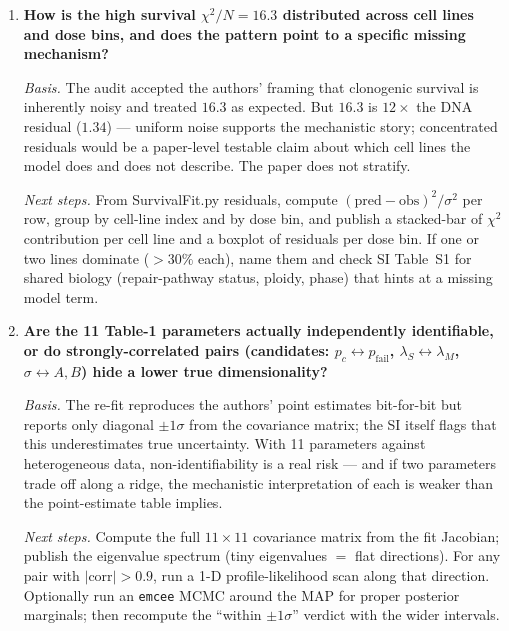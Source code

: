 \begin{enumerate}
  \emph{Next steps.} Use the Medras-MC 2021 chromatin-on-sphere driver to
  regenerate SI Fig.~S2 (misrepair fraction vs.\ $\sigma/R$ across break
  counts), fit $A,B$ to $\omega(R,\sigma) = A + (1{-}A) e^{-B\sigma/R}$,
  report the recovered constants with uncertainty, then re-run
  \texttt{DNAModelFit.py} and \texttt{SurvivalFit.py} with those
  constants. Check whether any of the 11 fitted parameters drift outside
  their paper $\pm 1\sigma$ bands.

\item \textbf{How is the high survival $\chi^2/N = 16.3$ distributed
      across cell lines and dose bins, and does the pattern point to a
      specific missing mechanism?}

  \emph{Basis.} The audit accepted the authors' framing that clonogenic
  survival is inherently noisy and treated $16.3$ as expected. But
  $16.3$ is $12\times$ the DNA residual ($1.34$) --- uniform noise
  supports the mechanistic story; concentrated residuals would be a
  paper-level testable claim about which cell lines the model does and
  does not describe. The paper does not stratify.

  \emph{Next steps.} From SurvivalFit.py residuals, compute
  $(\text{pred} - \text{obs})^2 / \sigma^2$ per row, group by cell-line
  index and by dose bin, and publish a stacked-bar of $\chi^2$
  contribution per cell line and a boxplot of residuals per dose bin. If
  one or two lines dominate ($>30\%$ each), name them and check SI
  Table~S1 for shared biology (repair-pathway status, ploidy, phase)
  that hints at a missing model term.

\item \textbf{Are the 11 Table-1 parameters actually independently
      identifiable, or do strongly-correlated pairs
      (candidates: $p_c \leftrightarrow p_{\text{fail}}$, $\lambda_S
      \leftrightarrow \lambda_M$, $\sigma \leftrightarrow A,B$) hide a
      lower true dimensionality?}

  \emph{Basis.} The re-fit reproduces the authors' point estimates
  bit-for-bit but reports only diagonal $\pm 1\sigma$ from the covariance
  matrix; the SI itself flags that this underestimates true uncertainty.
  With 11 parameters against heterogeneous data, non-identifiability is
  a real risk --- and if two parameters trade off along a ridge, the
  mechanistic interpretation of each is weaker than the point-estimate
  table implies.

  \emph{Next steps.} Compute the full $11\times 11$ covariance matrix
  from the fit Jacobian; publish the eigenvalue spectrum (tiny
  eigenvalues $=$ flat directions). For any pair with
  $|\text{corr}| > 0.9$, run a 1-D profile-likelihood scan along that
  direction. Optionally run an \texttt{emcee} MCMC around the MAP for
  proper posterior marginals; then recompute the ``within $\pm 1\sigma$''
  verdict with the wider intervals.


\end{enumerate}
